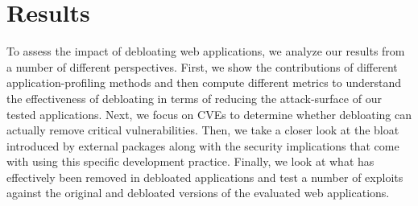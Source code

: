 \section{Results}
\label{section:results}

To assess the impact of debloating web applications, we analyze our results
from a number of different perspectives. First, we show the contributions of different application-profiling methods and then compute different metrics
to understand the effectiveness of debloating in terms of reducing the attack-surface of our tested applications. Next, we focus on CVEs to determine whether
debloating can actually remove critical vulnerabilities. Then, we take
a closer look at the bloat introduced by external packages along with the
security implications that come with using this specific development practice.
Finally, we look at what has effectively been removed in debloated applications and test a number of exploits against the original and debloated versions of the evaluated web applications.
  
